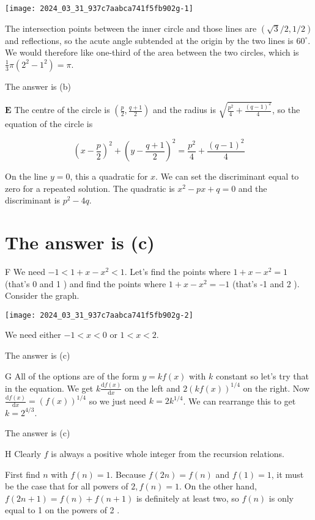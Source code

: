 \documentclass[10pt]{article}
\begin{document}
\begin{center}
\texttt{[image: 2024\_03\_31\_937c7aabca741f5fb902g-1]}
\end{center}

The intersection points between the inner circle and those lines are $(\sqrt{3} / 2,1 / 2)$ and reflections, so the acute angle subtended at the origin by the two lines is $60^{\circ}$. We would therefore like one-third of the area between the two circles, which is $\frac{1}{3} \pi\left(2^{2}-1^{2}\right)=\pi$.

The answer is (b)

$\mathbf{E}$ The centre of the circle is $\left(\frac{p}{2}, \frac{q+1}{2}\right)$ and the radius is $\sqrt{\frac{p^{2}}{4}+\frac{(q-1)^{2}}{4}}$, so the equation of the circle is

$$
\left(x-\frac{p}{2}\right)^{2}+\left(y-\frac{q+1}{2}\right)^{2}=\frac{p^{2}}{4}+\frac{(q-1)^{2}}{4}
$$

On the line $y=0$, this a quadratic for $x$. We can set the discriminant equal to zero for a repeated solution. The quadratic is $x^{2}-p x+q=0$ and the discriminant is $p^{2}-4 q$.

\section*{The answer is (c)}
F We need $-1<1+x-x^{2}<1$. Let's find the points where $1+x-x^{2}=1$ (that's 0 and 1 ) and find the points where $1+x-x^{2}=-1$ (that's -1 and 2 ). Consider the graph.

\begin{center}
\texttt{[image: 2024\_03\_31\_937c7aabca741f5fb902g-2]}
\end{center}

We need either $-1<x<0$ or $1<x<2$.

The answer is (c)

G All of the options are of the form $y=k f(x)$ with $k$ constant so let's try that in the equation. We get $k \frac{\mathrm{d} f(x)}{\mathrm{d} x}$ on the left and $2(k f(x))^{1 / 4}$ on the right. Now $\frac{\mathrm{d} f(x)}{\mathrm{d} x}=(f(x))^{1 / 4}$ so we just need $k=2 k^{1 / 4}$. We can rearrange this to get $k=2^{4 / 3}$.

The answer is (c)

H Clearly $f$ is always a positive whole integer from the recursion relations.

First find $n$ with $f(n)=1$. Because $f(2 n)=f(n)$ and $f(1)=1$, it must be the case that for all powers of $2, f(n)=1$. On the other hand, $f(2 n+1)=f(n)+f(n+1)$ is definitely at least two, so $f(n)$ is only equal to 1 on the powers of 2 .
\end{document}
